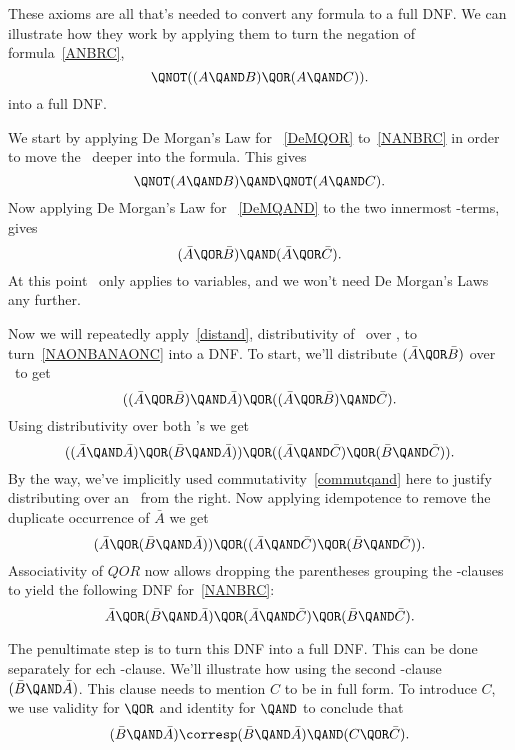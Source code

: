 These axioms are all that's needed to convert any formula to a full
DNF.  We can illustrate how they work by applying them to turn the
negation of formula~\eqref{ANBRC},
\begin{equation}\label{NANBRC}
\QNOT((A \QAND B) \QOR (A \QAND C)).
\end{equation}
into a full DNF.

We start by applying De Morgan's Law for \QOR~\eqref{DeMQOR}
to~\eqref{NANBRC} in order to move the \QNOT\ deeper into the formula.
This gives
\[
\QNOT(A \QAND B) \QAND \QNOT(A \QAND C).
\]
Now applying De Morgan's Law for \QAND~\eqref{DeMQAND} to the two
innermost \QAND-terms, gives
\begin{equation}\label{NAONBANAONC}
(\bar{A} \QOR \bar{B}) \QAND (\bar{A} \QOR \bar{C}).
\end{equation}
At this point \QNOT\ only applies to variables, and we won't need
De Morgan's Laws any further.

Now we will repeatedly apply~\eqref{distand}, distributivity of
\QAND\ over \QOR, to turn~\eqref{NAONBANAONC} into a DNF.
To start, we'll distribute $(\bar{A} \QOR \bar{B})$ over \QAND\ to get
\[
((\bar{A} \QOR \bar{B}) \QAND \bar{A}) \QOR ((\bar{A} \QOR \bar{B}) \QAND \bar{C}).
\]
Using distributivity over both \QAND's we get
\[
((\bar{A} \QAND \bar{A}) \QOR (\bar{B} \QAND \bar{A})) \QOR 
((\bar{A} \QAND \bar{C}) \QOR (\bar{B} \QAND \bar{C})).
\]
By the way, we've implicitly used commutativity~\eqref{commutqand}
here to justify distributing over an \QAND\ from the right.  Now
applying idempotence to remove the duplicate occurrence of $\bar{A}$ we
get
\[
(\bar{A} \QOR (\bar{B} \QAND \bar{A})) \QOR 
((\bar{A} \QAND \bar{C}) \QOR (\bar{B} \QAND \bar{C})).
\]
Associativity of $QOR$ now allows dropping the parentheses grouping
the \QAND-clauses to yield the following DNF
for~\eqref{NANBRC}:
\begin{equation}\label{DFNAONBANAONC}
\bar{A} \QOR
(\bar{B} \QAND \bar{A}) \QOR 
(\bar{A} \QAND \bar{C}) \QOR
(\bar{B} \QAND \bar{C}).
\end{equation}

The penultimate step is to turn this DNF into a full DNF.  This can be
done separately for ech \QAND-clause.  We'll illustrate how using the
second \QAND-clause $(\bar{B} \QAND \bar{A})$.  This clause needs to
mention $C$ to be in full form.  To introduce $C$, we use validity for
$\QOR$ and identity for $\QAND$ to conclude that
\[
(\bar{B} \QAND \bar{A}) \corresp (\bar{B} \QAND \bar{A}) \QAND (C \QOR \bar{C}).
\]

